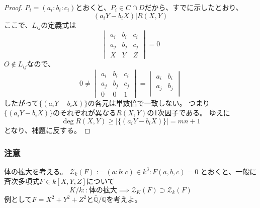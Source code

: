\documentclass[a4paper]{jsarticle}
\begin{document}
\begin{proof}
        $P_i=(a_i:b_i:c_i)$とおくと、$P_i \in C \cap D$だから、すでに示したとおり、
        \[ (a_i Y - b_i X) | R(X,Y) \]
        ここで、$L_{ij}$の定義式は
        \[
            \begin{vmatrix}
                a_i& b_i& c_i \\
                a_j& b_j& c_j \\
                X  & Y  & Z
            \end{vmatrix}
            =0
        \]
        $O \not \in L_{ij}$なので、
        \[
            0 \neq
            \begin{vmatrix}
                a_i& b_i& c_i \\
                a_j& b_j& c_j \\
                0  & 0  & 1
            \end{vmatrix}
            =
            \begin{vmatrix}
                a_i& b_i \\
                a_j& b_j \\
            \end{vmatrix}
        \]
        したがって$\{ (a_i Y - b_i X) \}$の各元は単数倍で一致しない。
        つまり$\{ (a_i Y - b_i X) \}$のそれぞれが異なる$R(X,Y)$の1次因子である。
        ゆえに
        \[ \deg R(X,Y) \geq |\{ (a_i Y - b_i X) \}| = mn+1\]
        となり、補題に反する。
        
    \end{proof}

    \subsubsection{注意}
        体の拡大を考える。
        $\mathcal{Z}_{k}(F):={(a:b:c) \in k^3 : F(a,b,c)=0}$
        とおくと、一般に斉次多項式$F \in k[X,Y,Z]$について
        \[ K/k::\mbox{体の拡大} \implies \mathcal{Z}_K(F) \supset \mathcal{Z}_k(F) \]
        例として$F=X^2+Y^2+Z^2$と$\bar{\mathbb{Q}}/\mathbb{Q}$を考えよ。
\end{document}
